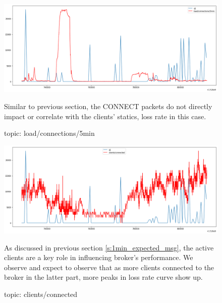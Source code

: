 \documentclass[12pt, letterpaper]{article}
\begin{document}
\begin{figure}
	\setlength{\tabcolsep}{0pt}
	\caption{topic: load/connections/5min}
	\label{f:loss_cnt_load_connections_5min}
	\begin{center}
		\includegraphics[width=\textwidth]{loss_cnt/loss-load_connections_5min} 
	\end{center}
	Similar to previous section, the CONNECT packets do not directly impact or correlate with the clients' statics, loss rate in this case.
\end{figure}

\begin{figure}
	\setlength{\tabcolsep}{0pt}
	\caption{topic: clients/connected}
	\label{f:loss_cnt_clients_connected}
	\begin{center}
		\includegraphics[width=\textwidth]{loss_cnt/loss-clients_connected} 
	\end{center}
	As discussed in previous section \ref{s:1min_expected_msg}, the active clients are a key role in influencing broker's performance. We observe and expect to observe that as more clients connected to the broker in the latter part, more peaks in loss rate curve show up.
\end{figure}
\end{document}
